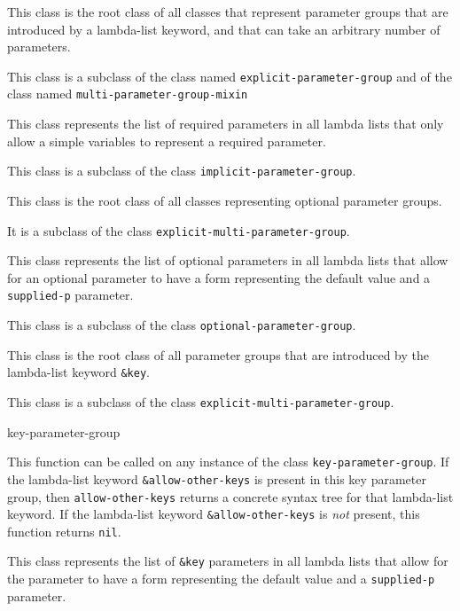 
This class is the root class of all classes that represent parameter
groups that are introduced by a lambda-list keyword, and that can take
an arbitrary number of parameters.

This class is a subclass of the class named
\texttt{explicit-parameter-group} and of the class named
\texttt{multi-parameter-group-mixin}


This class represents the list of required parameters in all lambda
lists that only allow a simple variables to represent a required
parameter.

This class is a subclass of the class \texttt{implicit-parameter-group}.


This class is the root class of all classes representing optional
parameter groups.

It is a subclass of the class \texttt{explicit-multi-parameter-group}.


This class represents the list of optional parameters in all lambda
lists that allow for an optional parameter to have a form representing
the default value and a \texttt{supplied-p} parameter.

This class is a subclass of the class \texttt{optional-parameter-group}.


This class is the root class of all parameter groups that are
introduced by the lambda-list keyword \texttt{\&key}.

This class is a subclass of the class \texttt{explicit-multi-parameter-group}.

 {key-parameter-group}

This function can be called on any instance of the class
\texttt{key-parameter-group}.  If the lambda-list keyword
\texttt{\&allow-other-keys} is present in this key parameter group,
then \texttt{allow-other-keys} returns a concrete syntax
tree for that lambda-list keyword.  If the lambda-list keyword
\texttt{\&allow-other-keys} is \emph{not} present, this function
returns \texttt{nil}.


This class represents the list of \texttt{\&key} parameters in all
lambda lists that allow for the parameter to have a form representing
the default value and a \texttt{supplied-p} parameter.

